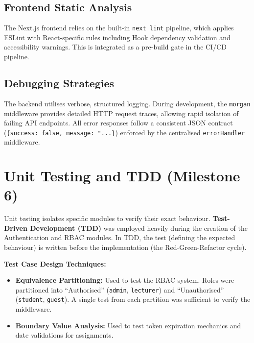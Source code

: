 \documentclass[12pt, a4paper]{report}
\begin{document}
\subsection{Frontend Static Analysis}
The Next.js frontend relies on the built-in \texttt{next lint} pipeline, which applies ESLint with React-specific rules including Hook dependency validation and accessibility warnings. This is integrated as a pre-build gate in the CI/CD pipeline.

\subsection{Debugging Strategies}
The backend utilises verbose, structured logging. During development, the \texttt{morgan} middleware provides detailed HTTP request traces, allowing rapid isolation of failing API endpoints. All error responses follow a consistent JSON contract (\texttt{\{success: false, message: "...\}}) enforced by the centralised \texttt{errorHandler} middleware.

\section{Unit Testing and TDD (Milestone 6)}
Unit testing isolates specific modules to verify their exact behaviour. \textbf{Test-Driven Development (TDD)} was employed heavily during the creation of the Authentication and RBAC modules. In TDD, the test (defining the expected behaviour) is written before the implementation (the Red-Green-Refactor cycle).

\textbf{Test Case Design Techniques:}
\begin{itemize}[noitemsep]
    \item \textbf{Equivalence Partitioning:} Used to test the RBAC system. Roles were partitioned into ``Authorised'' (\texttt{admin}, \texttt{lecturer}) and ``Unauthorised'' (\texttt{student}, \texttt{guest}). A single test from each partition was sufficient to verify the middleware.
    \item \textbf{Boundary Value Analysis:} Used to test token expiration mechanics and date validations for assignments.
\end{itemize}
\end{document}

